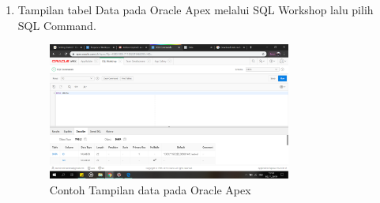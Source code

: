 \begin{enumerate}
\item Tampilan tabel Data pada Oracle Apex melalui SQL Workshop lalu pilih SQL Command.
    \begin{figure}[!htbp]
    \centering
    \includegraphics[width=8cm]{picture/35.png}
    \caption{Contoh Tampilan data pada Oracle Apex}
    \end{figure}


    
    
\end{enumerate}


